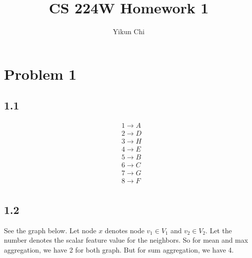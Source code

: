 \documentclass{book}
\title{CS 224W Homework 1}
\author{Yikun Chi}
\begin{document}
\maketitle

\section*{Problem 1}
\subsection*{1.1}
\begin{align*}
    & 1 \rightarrow A\\
    & 2 \rightarrow D\\
    & 3 \rightarrow H\\
    & 4 \rightarrow E\\
    & 5 \rightarrow B\\
    & 6 \rightarrow C\\
    & 7 \rightarrow G\\
    & 8 \rightarrow F\\
\end{align*}

\subsection*{1.2}
See the graph below. Let node $x$ denotes node $v_1 \in V_1$ and $v_2 \in V_2$. Let the number denotes the scalar feature value for the neighbors. So for mean and max aggregation, we have 2 for both graph. But for sum aggregation, we have 4. 

\end{document}
